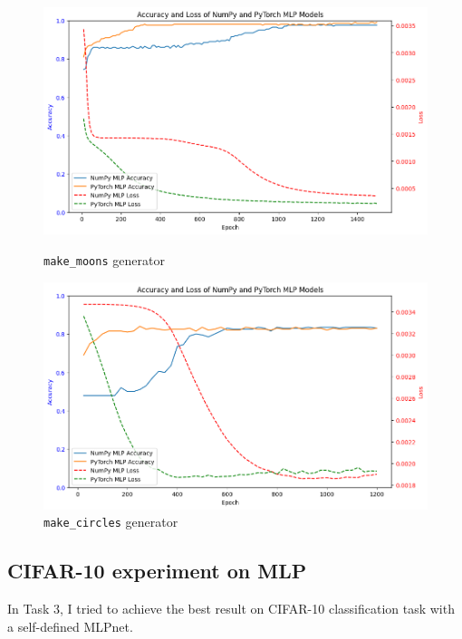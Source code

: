 \documentclass[12pt]{article}
\begin{document}
\begin{figure}[htbp]
    \centering
    \begin{minipage}{0.45\textwidth}
        \centering
        \includegraphics[width=\textwidth]{p1_fig1.png}
        \caption{\texttt{make\_moons} generator}
        \label{fig:p1}
    \end{minipage}%
    \hfill
    \begin{minipage}{0.45\textwidth}
        \centering
        \includegraphics[width=\textwidth]{p1_fig2.png}
        \caption{\texttt{make\_circles} generator}
        \label{fig:p2}
    \end{minipage}
\end{figure}

\subsection{CIFAR-10 experiment on MLP}

In Task 3, I tried to achieve the best result on CIFAR-10 classification task with a self-defined MLPnet.
\end{document}
